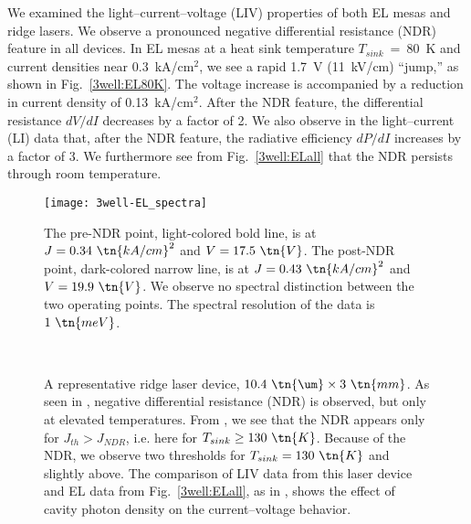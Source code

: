 We examined the light--current--voltage (LIV) properties of both EL mesas and ridge lasers.  We observe a pronounced negative differential resistance (NDR) feature in all devices.  In EL mesas at a heat sink temperature $T_{sink}$~=~80~K and current densities near 0.3~kA/cm$^2$, we see a rapid 1.7~V (11~kV/cm) ``jump,'' as shown in Fig.~\ref{3well:EL80K}.  The voltage increase is accompanied by a reduction in current density of 0.13~kA/cm$^2$.  After the NDR feature, the differential resistance $dV/dI$ decreases by a factor of 2.  We also observe in the light--current (LI) data that, after the NDR feature, the radiative efficiency $dP/dI$ increases by a factor of 3.  We furthermore see from Fig.~\ref{3well:ELall} that the NDR persists through room temperature.

\begin{figure}[tp]
\centering
\texttt{[image: 3well-EL\_spectra]}
\caption[Comparison of EL spectra at pre- and post-NDR operating points]{  The pre-NDR point, light-colored bold line, is at $J=0.34~\tn{kA/cm}^2$ and $V=17.5~\tn{V}$.  The post-NDR point, dark-colored narrow line, is at $J=0.43~\tn{kA/cm}^2$ and $V=19.9~\tn{V}$.  We observe no spectral distinction between the two operating points.  The spectral resolution of the data is $1~\tn{meV}$.}
\label{3well:EL_spectra}
\end{figure}


\begin{figure}[tp]
\centering
{}%
\\
%
\hfil
{}%
\caption[Three injector well LIV]{ A representative ridge laser device, $10.4~\tn{\um}\times3~\tn{mm}$.  As seen in , negative differential resistance (NDR) is observed, but only at elevated temperatures.  From , we see that the NDR appears only for $J_{th}>J_{NDR}$, i.e. here for $T_{sink}\geq130~\tn{K}$.  Because of the NDR, we observe two thresholds for $T_{sink}=130~\tn{K}$ and slightly above.  The comparison of LIV data from this laser device and EL data from Fig.~\ref{3well:ELall}, as in , shows the effect of cavity photon density on the current--voltage behavior.}
\label{3well:lasing_LIV}
\end{figure}

